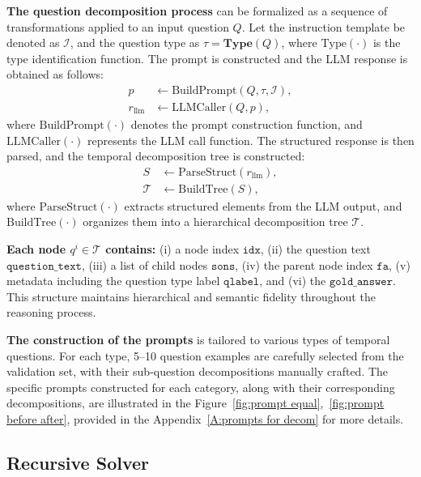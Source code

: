 \documentclass[11pt]{article}
\begin{document}
\textbf{The question decomposition process} can be formalized as a sequence of transformations applied to an input question \( Q \). Let the instruction template be denoted as \( \mathcal{I} \), and the question type as \( \tau = \textbf{Type}(Q) \), where \( \text{Type}(\cdot) \) is the type identification function. The prompt is constructed and the LLM response is obtained as follows:
\begin{align}
    p &\leftarrow \text{BuildPrompt}(Q, \tau, \mathcal{I}),\\
    r_{\text{llm}} &\leftarrow \text{LLMCaller}(Q,p),
\end{align}
where \( \text{BuildPrompt}(\cdot) \) denotes the prompt construction function, and \( \text{LLMCaller}(\cdot) \) represents the LLM call function. The structured response is then parsed, and the temporal decomposition tree is constructed:
\begin{align}
    S &\leftarrow \text{ParseStruct}(r_{\text{llm}}), \\
    \mathcal{T} &\leftarrow \text{BuildTree}(S),
\end{align}
where \( \text{ParseStruct}(\cdot) \) extracts structured elements from the LLM output, and \( \text{BuildTree}(\cdot) \) organizes them into a hierarchical decomposition tree \( \mathcal{T} \).

\textbf{Each node \( q^i \in \mathcal{T} \) contains:} (i) a node index \( \texttt{idx} \), (ii) the question text \( \texttt{question\_text} \), (iii) a list of child nodes \( \texttt{sons} \), (iv) the parent node index \( \texttt{fa} \), (v) metadata including the question type label \( \texttt{qlabel} \), and (vi) the \( \texttt{gold\_answer} \). This structure maintains hierarchical and semantic fidelity throughout the reasoning process.




\textbf{The construction of the prompts} is tailored to various types of temporal questions. For each type, 5--10 question examples are carefully selected from the validation set, with their sub-question decompositions manually crafted. The specific prompts constructed for each category, along with their corresponding decompositions, are illustrated in the Figure~\ref{fig:prompt equal},~\ref{fig:prompt before after}, provided in the Appendix~\ref{A:prompts for decom} for more details.





\subsection{Recursive Solver}\label{section:recursive}
\end{document}
